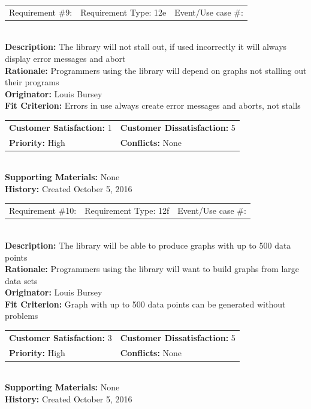 \documentclass[12pt, titlepage]{article}
\begin{document}
%
%
\begin{reqbox}
\begin{tabular}{ccc}
Requirement \#9: & Requirement Type: 12e & Event/Use case \#: \\
\end{tabular} \\
\textbf{Description:} The library will not stall out, if used incorrectly it will always display error messages and abort\\
\textbf{Rationale:} Programmers using the library will depend on graphs not stalling out their programs \\
\textbf{Originator:} Louis Bursey\\
\textbf{Fit Criterion:}    Errors in use always create error messages and aborts, not stalls\\
\begin{tabular}{ll}
\textbf{Customer Satisfaction:} 1 & \textbf{Customer Dissatisfaction:} 5 \\
\textbf{Priority:} High & \textbf{Conflicts:} None\\
\end{tabular} \\
\textbf{Supporting Materials:} None \\
\textbf{History:} Created October 5, 2016
\end{reqbox}
%
%
\begin{reqbox}
\begin{tabular}{ccc}
Requirement \#10: & Requirement Type: 12f & Event/Use case \#: \\
\end{tabular} \\
\textbf{Description:} The library will be able to produce graphs with up to 500 data points \\
\textbf{Rationale:} Programmers using the library will want to build graphs from large data sets \\
\textbf{Originator:} Louis Bursey\\
\textbf{Fit Criterion:}  Graph with up to 500 data points can be generated without problems\\
\begin{tabular}{ll}
\textbf{Customer Satisfaction:} 3 & \textbf{Customer Dissatisfaction:} 5 \\
\textbf{Priority:} High & \textbf{Conflicts:} None\\
\end{tabular} \\
\textbf{Supporting Materials:} None \\
\textbf{History:} Created October 5, 2016
\end{reqbox}
%
%
%
\end{document}
